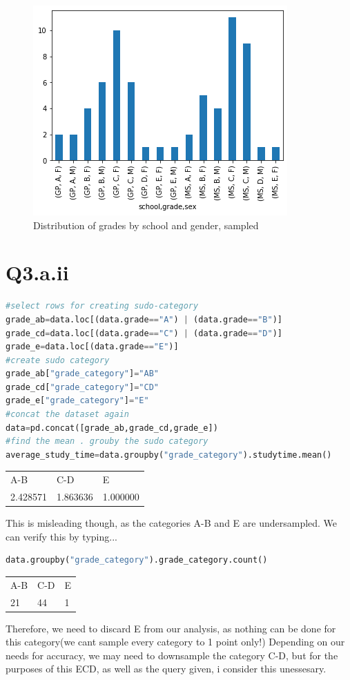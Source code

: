 \documentclass[openany]{article}
\begin{document}
		\begin{figure}[H]
			\iftrue
			\centering
			\caption{Distribution of grades by school and gender, sampled}
			\includegraphics[scale=0.5]{q3-a-i-3}
			\fi
		\end{figure}
		
	\section{Q3.a.ii}
		\begin{lstlisting}[language=Python]
#select rows for creating sudo-category
grade_ab=data.loc[(data.grade=="A") | (data.grade=="B")]
grade_cd=data.loc[(data.grade=="C") | (data.grade=="D")]
grade_e=data.loc[(data.grade=="E")]
#create sudo category
grade_ab["grade_category"]="AB"
grade_cd["grade_category"]="CD"
grade_e["grade_category"]="E"
#concat the dataset again
data=pd.concat([grade_ab,grade_cd,grade_e])
#find the mean . grouby the sudo category
average_study_time=data.groupby("grade_category").studytime.mean()
		\end{lstlisting}
		\begin{table}[H]
			\centering
			\begin{tabular}{lll}
				A-B      & C-D      & E        \\
				2.428571 & 1.863636 & 1.000000 \\
			\end{tabular}
		\end{table}
		This is misleading though, as the categories A-B and E are undersampled. We can verify this by typing...
		\begin{lstlisting}[language=Python]
data.groupby("grade_category").grade_category.count()
		\end{lstlisting}
		\begin{table}[H]
			\centering
			\begin{tabular}{lll}
				A-B      & C-D      & E        \\
				21 & 44 & 1 \\
			\end{tabular}
		\end{table}
		Therefore, we need to discard E from our analysis, as nothing can be done for this category(we cant sample every category to 1 point only!) 
		Depending on our needs for accuracy, we may need to downsample the category C-D, but for the purposes of this ECD, as well as the query given, 
		i consider this unessesary.
\end{document}
